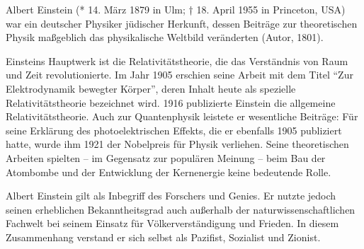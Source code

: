 Albert Einstein (* 14. März 1879 in Ulm; † 18. April 1955 in Princeton, USA) war ein deutscher Physiker jüdischer Herkunft, dessen Beiträge zur theoretischen Physik maßgeblich das physikalische Weltbild veränderten (Autor, 1801). 

Einsteins Hauptwerk ist die Relativitätstheorie, die das Verständnis von Raum und Zeit revolutionierte. Im Jahr 1905 erschien seine Arbeit mit dem Titel ``Zur Elektrodynamik bewegter Körper'', deren Inhalt heute als spezielle Relativitätstheorie bezeichnet wird. 1916 publizierte Einstein die allgemeine Relativitätstheorie. Auch zur Quantenphysik leistete er wesentliche Beiträge: Für seine Erklärung des photoelektrischen Effekts, die er ebenfalls 1905 publiziert hatte, wurde ihm 1921 der Nobelpreis für Physik verliehen. Seine theoretischen Arbeiten spielten – im Gegensatz zur populären Meinung – beim Bau der Atombombe und der Entwicklung der Kernenergie keine bedeutende Rolle.

Albert Einstein gilt als Inbegriff des Forschers und Genies. Er nutzte jedoch seinen erheblichen Bekanntheitsgrad auch außerhalb der naturwissenschaftlichen Fachwelt bei seinem Einsatz für Völkerverständigung und Frieden. In diesem Zusammenhang verstand er sich selbst als Pazifist, Sozialist und Zionist.